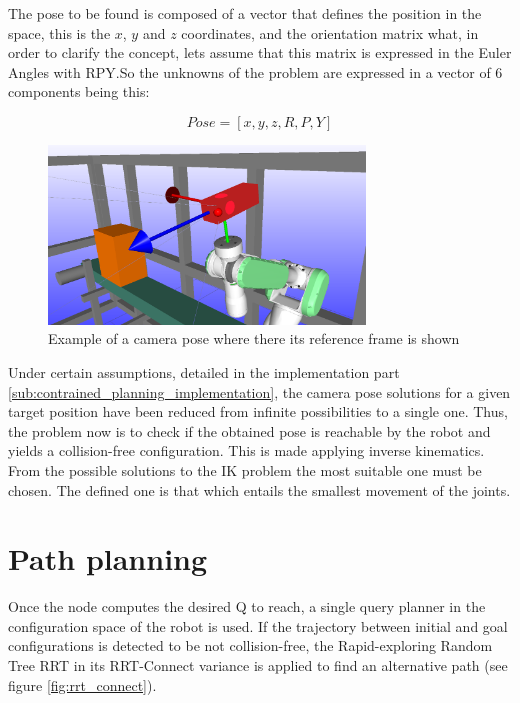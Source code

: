 The pose to be found is composed of a vector that defines the position in the space, this is the $x$, $y$ and $z$ coordinates, and the orientation matrix what, in order to clarify the concept, lets assume that this matrix is expressed in the Euler Angles with RPY.So the unknowns of the problem are expressed in a vector of 6 components being this:

	\begin{equation}
	\label{eq:pose_cartesian_coordinates}
		Pose = [x,y,z,R,P,Y]
	\end{equation}


	\begin{figure}[!ht]
		\centering
		\includegraphics[width=0.75\textwidth]{figures/camera_pose_example}
		\caption{Example of a camera pose where there its reference frame is shown}
		\label{fig:camera_pose_example}
	\end{figure}
	
Under certain assumptions, detailed in the implementation part \ref{sub:contrained_planning_implementation}, the camera pose solutions for a given target position have been reduced from infinite possibilities to a single one. 
Thus, the problem now is to check if the obtained pose is reachable by the robot and yields a collision-free configuration. 
This is made applying inverse kinematics. 
From the possible solutions to the IK problem the most suitable one must be chosen.
The defined one is that which entails the smallest movement of the joints.

\section{Path planning} %
\label{sec:path_planning}
Once the node computes the desired Q to reach, a single query planner in the configuration space of the robot is used. If the trajectory between initial and goal configurations is detected to be not collision-free, the Rapid-exploring Random Tree RRT in its RRT-Connect variance \cite{RRTConnect} is applied to find an alternative path (see figure \ref{fig:rrt_connect}).\\

